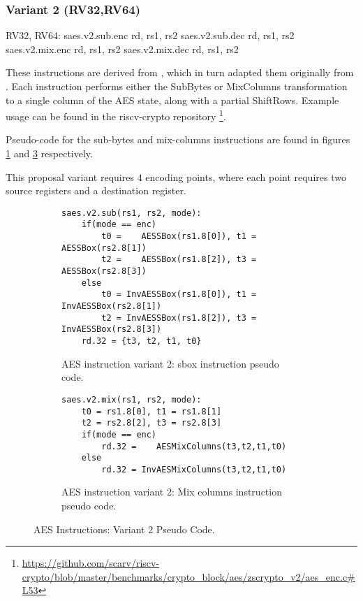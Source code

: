 
\subsubsection{Variant 2 (RV32,RV64)}

\begin{cryptoisa}
RV32, RV64:
    saes.v2.sub.enc    rd, rs1, rs2
    saes.v2.sub.dec    rd, rs1, rs2
    saes.v2.mix.enc    rd, rs1, rs2
    saes.v2.mix.dec    rd, rs1, rs2
\end{cryptoisa}

These instructions are derived from \cite{MPP:19}, which in turn adapted
them originally from \cite{TG:06}.
Each instruction performs either the SubBytes or MixColumns transformation
to a single column of the AES state, along with a partial ShiftRows.
Example usage can be found in the riscv-crypto repository
\footnote{\url{https://github.com/scarv/riscv-crypto/blob/master/benchmarks/crypto_block/aes/zscrypto_v2/aes_enc.c\#L53}}.

Pseudo-code for the sub-bytes and mix-columns instructions are found in
figures
\ref{fig:pesudo:aes:v2:sub}
and
\ref{fig:pesudo:aes:v2:mix}
respectively.

This proposal variant requires $4$ encoding points, where each point
requires two source registers and a destination register.

\begin{figure}
\begin{subfigure}[b]{1.0\textwidth}
\begin{lstlisting}
saes.v2.sub(rs1, rs2, mode):
    if(mode == enc)
        t0 =    AESSBox(rs1.8[0]), t1 =    AESSBox(rs2.8[1])
        t2 =    AESSBox(rs1.8[2]), t3 =    AESSBox(rs2.8[3])
    else
        t0 = InvAESSBox(rs1.8[0]), t1 = InvAESSBox(rs2.8[1])
        t2 = InvAESSBox(rs1.8[2]), t3 = InvAESSBox(rs2.8[3])
    rd.32 = {t3, t2, t1, t0} 
\end{lstlisting}
\caption{AES instruction variant 2: sbox instruction pseudo code.}
\label{fig:pesudo:aes:v2:sub}
\end{subfigure}
\begin{subfigure}[b]{1.0\textwidth}
\begin{lstlisting}
saes.v2.mix(rs1, rs2, mode):
    t0 = rs1.8[0], t1 = rs1.8[1]
    t2 = rs2.8[2], t3 = rs2.8[3]
    if(mode == enc)
        rd.32 =    AESMixColumns(t3,t2,t1,t0)
    else
        rd.32 = InvAESMixColumns(t3,t2,t1,t0)
\end{lstlisting}
\caption{AES instruction variant 2: Mix columns instruction pseudo code.}
\label{fig:pesudo:aes:v2:mix}
\end{subfigure}
\caption{AES Instructions: Variant 2 Pseudo Code.}
\end{figure}

